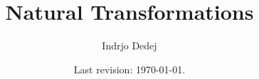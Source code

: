 



\title{Natural Transformations}
\author{Indrjo Dedej}
\date{Last revision: \today{}.}



\maketitle

\tableofcontents






